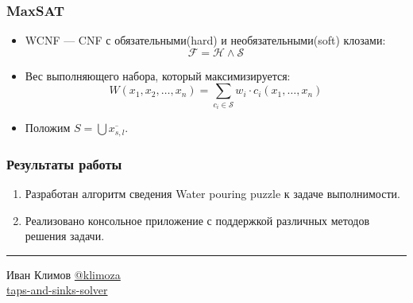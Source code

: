 \documentclass[14pt,aspectratio=169,hyperref={pdftex,unicode},xcolor=dvipsnames]{beamer}
\begin{document}
\begin{frame}
\frametitle{MaxSAT}
\begin{itemize}
  \item WCNF --- CNF с обязательными(hard) и необязательными(soft) клозами:
    \begin{equation*}
      \mathcal{F} = \mathcal{H} \wedge \mathcal{S}
    \end{equation*}
  \item Вес выполняющего набора, который максимизируется:
  \begin{equation*}
    W(x_1, x_2, \dotsc, x_n) = \sum\limits_{c_i \in \mathcal{S}} w_i \cdot c_i(x_1, \dotsc, x_n)
  \end{equation*}
  \item Положим $S = \bigcup \overline{x_{s, l}}$.
\end{itemize}
\end{frame}

\begin{frame}
\frametitle{Результаты работы}

\begin{enumerate}
\item Разработан алгоритм сведения Water pouring puzzle к задаче выполнимости.
\item Реализовано консольное приложение с поддержкой различных методов решения задачи.
\end{enumerate}

\vspace{5mm}\hrule\vspace{3mm}


\begin{multicols}{2}
\begin{center}
  \mbox{}\hfill Иван Климов \href{https://t.me/klimoza}{@klimoza} \\
  \mbox{}\hfill \href{https://github.com/klimoza/taps-and-sinks-solver}{taps-and-sinks-solver}
\end{center}
\columnbreak
\begin{center}
\end{center}
\end{multicols}

\end{frame}
\end{document}
